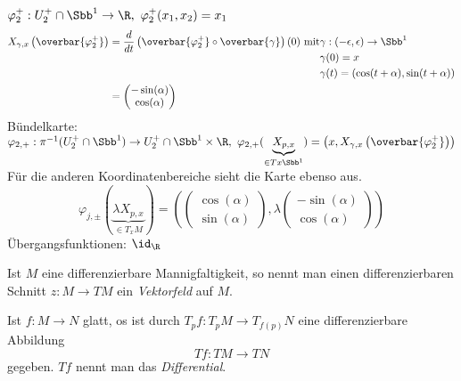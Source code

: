 \begin{rem*}
	$ \varphi_2^+ : U_2^+ \cap \Sbb^1 \to \R,\ \varphi_2^+(x_1,x_2) = x_1 $
	\begin{align*}
		X_{\gamma,x}\left( \overbar{\varphi_2^+} \right) &= \frac{d}{dt} \left( \overbar{\varphi_2^+} \circ \overbar{\gamma} \right) (0)\ \text{mit} \begin{aligned}[t]
			&\gamma: (-\epsilon,\epsilon) \to \Sbb^1\\
			&\gamma(0) = x\\
			&\gamma(t) = (\cos(t+\alpha),\sin(t+\alpha))
		\end{aligned}\\
		&= \begin{pmatrix}
			-\sin(\alpha) \\ \cos(\alpha)
		\end{pmatrix}
	\end{align*}
	Bündelkarte: $\varphi_{2,+}: \pi^{-1}(U_2^+ \cap \Sbb^1) \to U_2^+ \cap \Sbb^1 \times \R,\ \varphi_{2,+}(\underbrace{X_{p,x}}_{\in Tx\Sbb^1}) = \left( x, X_{\gamma,x}\left( \overbar{\varphi_2^+} \right) \right)$\\
	Für die anderen Koordinatenbereiche sieht die Karte ebenso aus.
	$$ \varphi_{j,\pm} (\underbrace{\lambda X_{p,x}}_{\in T_xM}) = \left( \begin{pmatrix}
		\cos(\alpha)\\\sin(\alpha)
	\end{pmatrix}, \lambda \begin{pmatrix}
	-\sin(\alpha)\\\cos(\alpha)
	\end{pmatrix} \right) $$
	Übergangsfunktionen: $\id_\R$
\end{rem*}

\begin{defn}[Vektorfeld] 
 	Ist $M$ eine differenzierbare Mannigfaltigkeit, so nennt man einen differenzierbaren Schnitt $z: M \to TM$ ein \emph{Vektorfeld} auf $M$.
\end{defn}

\begin{defn}[Differential]
	Ist $ f: M \to N $ glatt, os ist durch $ T_pf: T_pM \to T_{f(p)}N $ eine differenzierbare Abbildung
	\[ Tf: TM \to TN \] gegeben. $Tf$ nennt man das \emph{Differential}.
\end{defn}